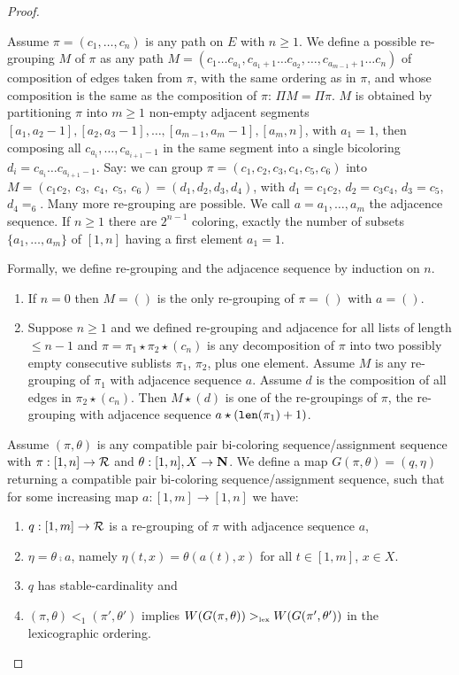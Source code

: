 \documentclass{lmcs}
\begin{document}
\begin{proof}
\begin{enumerate}
Assume $\pi=(c_1, \ldots, c_n)$ is any path on $E$ with $n\ge 1$. 
We define a possible re-grouping $M$ of $\pi$ as any path
$
M = 
(c_1\ldots c_{a_1},  
c_{a_1+1}\ldots c_{a_2},
\ldots,
 c_{a_{m-1}+1}\ldots c_{n})
$ 
of composition of edges taken from $\pi$, 
 with the same ordering as in $\pi$,
 and whose composition is the same as the composition of $\pi$: $\Pi M = \Pi \pi$.
 $M$ is obtained by partitioning $\pi$ into $m \ge 1$ non-empty adjacent segments 
$[a_1,a_2-1], [a_2,a_3-1], \ldots, [a_{m-1},a_m - 1],[a_m,n]$,
with $a_1=1$, 
then composing all $c_{a_{i}},\ldots, c_{a_{i+1}-1}$ in the same segment
 into a single bicoloring $d_i = c_{a_{i}} \ldots c_{a_{i+1}-1}$.
 Say: we can group $\pi=(c_1,c_2,c_3,c_4,c_5,c_6)$ into
 $M=(c_1c_2,\ c_3,\ c_4,\ c_5,\ c_6) = (d_1,d_2,d_3,d_4)$, with $d_1 = c_1c_2$,
 $d_2 = c_3c_4$, $d_3=c_5$, $d_4=_6$. Many more re-grouping are possible.
We call $a=a_1, \ldots, a_m$
the adjacence sequence.
If $n \ge 1$ there are $2^{n-1}$ coloring,
exactly the number of subsets $\{a_1,\ldots, a_m\}$ of $[1,n]$ 
having a first element $a_1 = 1$.

Formally, we define re-grouping and the adjacence sequence 
by induction on $n$. 
\begin{enumerate}
\item
If $n=0$ then $M=()$
is the only re-grouping of $\pi=()$ with $a=()$.
\item
Suppose $n \ge 1$ and we defined re-grouping and adjacence for all lists
of length $\le n-1$ and $\pi = \pi_1 \star \pi_2 \star (c_n)$ 
is any decomposition of $\pi$ into two possibly empty 
consecutive sublists $\pi_1$, $\pi_2$, plus one element. 
Assume $M$ is any re-grouping of $\pi_1$ with adjacence sequence $a$.
Assume $d$ is the composition of all edges in $\pi_2 \star (c_n)$.
Then $M \star (d)$ is one of the re-groupings of $\pi$, the re-grouping 
with adjacence sequence $a \star ({\mbox{\tt len}}(\pi_1)+1)$.
\end{enumerate}

Assume $(\pi,\theta)$ 
is any compatible pair bi-coloring sequence/assignment sequence
with $\pi:[1,n] \rightarrow {\mathcal R}$ and $\theta:[1,n],X\rightarrow {\bf N}$.
We define a map $G(\pi,\theta) = (q,\eta)$
returning a compatible pair bi-coloring sequence/assignment sequence,
such that for some increasing map $a:[1,m] \rightarrow [1,n]$ we have:

\begin{enumerate}
\item 
$q:[1,m] \rightarrow {\mathcal R}$ 
is a re-grouping of $\pi$ with adjacence sequence $a$,
\item
$\eta=\theta \comp a$, namely $\eta(t,x) = \theta(a(t),x)$ for all
 $t \in [1,m]$, $x \in X$. 
\item
$q$ has stable-cardinality and  
\item
$(\pi,\theta) <_1 (\pi',\theta')$ implies $W(G(\pi,\theta)) >_{\mbox{\tiny lex}} W(G(\pi',\theta'))$
in the lexicographic ordering.
\end{enumerate}


\end{enumerate}
\end{proof}
\end{document}
